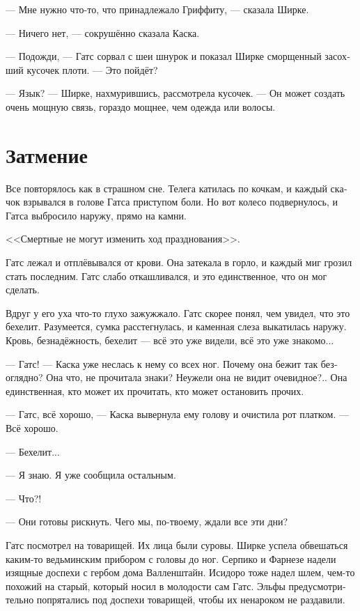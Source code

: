 \documentclass[a4paper,12pt,fleqn]{book}\usepackage{polyglossia}\setdefaultlanguage[babelshorthands=true]{russian}\setotherlanguage{english}\defaultfontfeatures{Ligatures=TeX,Mapping=tex-text}\usepackage{xcolor}\newcommand{\ml}[3]{#2}
\begin{document}
--- Мне нужно что-то, что принадлежало Гриффиту, --- сказала Ширке.

--- Ничего нет, --- сокрушённо сказала Каска.

--- Подожди, --- Гатс сорвал с шеи шнурок и показал Ширке сморщенный засохший кусочек плоти.
--- Это пойдёт?

--- Язык? --- Ширке, нахмурившись, рассмотрела кусочек.
--- Он может создать очень мощную связь, гораздо мощнее, чем одежда или волосы.

\section{Затмение}

Все повторялось как в страшном сне.
Телега катилась по кочкам, и каждый скачок взрывался в голове Гатса приступом боли.
Но вот колесо подвернулось, и Гатса выбросило наружу, прямо на камни.

<<Смертные не могут изменить ход празднования>>.

Гатс лежал и отплёвывался от крови.
Она затекала в горло, и каждый миг грозил стать последним.
Гатс слабо откашливался, и это единственное, что он мог сделать.

Вдруг у его уха что-то глухо зажужжало.
Гатс скорее понял, чем увидел, что это бехелит.
Разумеется, сумка расстегнулась, и каменная слеза выкатилась наружу.
Кровь, безнадёжность, бехелит --- всё это уже видели, всё это уже знакомо...

--- Гатс! --- Каска уже неслась к нему со всех ног.
Почему она бежит так безоглядно?
Она что, не прочитала знаки?
Неужели она не видит очевидное?..
Она единственная, кто может их прочитать, кто может остановить прочих.

--- Гатс, всё хорошо, --- Каска вывернула ему голову и очистила рот платком.
--- Всё хорошо.

--- Бехелит...

--- Я знаю.
Я уже сообщила остальным.

--- Что?!

--- Они готовы рискнуть.
Чего мы, по-твоему, ждали все эти дни?

Гатс посмотрел на товарищей.
Их лица были суровы.
Ширке успела обвешаться каким-то ведьминским прибором с головы до ног.
Серпико и Фарнезе надели изящные доспехи с гербом дома Валленштайн.
Исидоро тоже надел шлем, чем-то похожий на старый, который носил в молодости сам Гатс.
Эльфы предусмотрительно попрятались под доспехи товарищей, чтобы их ненароком не раздавили.
\end{document}

